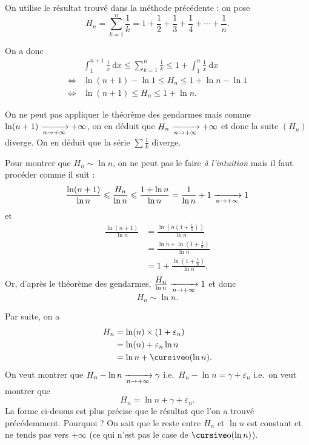 \begin{exo}
	On utilise le résultat trouvé dans la méthode précédente : on pose \[
		H_n = \sum_{k=1}^{n} \frac{1}{k} = 1 + \frac{1}{2} + \frac{1}{3} + \frac{1}{4} + \cdots + \frac{1}{n}
	.\]

	On a donc
	\begin{align*}
		&\int_{1}^{n+1} \frac{1}{x}~\mathrm{d}x \le \sum_{k=1}^{n} \frac{1}{k} \le 1 + \int_{1}^{n} \frac{1}{x}~\mathrm{d}x\\
		\iff& \ln(n+1) - \ln1 \le H_n \le 1 + \ln n - \ln 1\\
		\iff& \boxed{\ln(n+1) \le H_n \le 1 + \ln n.}
	\end{align*}

	On ne peut pas appliquer le théorème des gendarmes mais comme $\ln(n+1) \xrightarrow[n\to +\infty]{} +\infty$, on en déduit que $H_n \xrightarrow[n\to +\infty]{} +\infty$\/ et donc la suite $(H_n)$\/ diverge.
	On en déduit que la série $\sum \frac{1}{k}$\/ diverge.

	Pour montrer que $H_n \sim \ln n$, on ne peut pas le faire {\it à l'intuition}\/ mais il faut procéder comme il suit : \[
		\frac{\ln(n+1)}{\ln n} \leqslant \frac{H_n}{\ln n} \leqslant \frac{1 + \ln n}{\ln n} = \frac{1}{\ln n} + 1 \xrightarrow[n\to +\infty]{} 1
	\] et
	\begin{align*}
		\frac{\ln (n+1)}{\ln n} &= \frac{\ln\left( n \left( 1+\frac{1}{n} \right) \right) }{\ln n} \\
		&= \frac{\ln n + \ln \left( 1+ \frac{1}{n} \right)}{ \ln n} \\
		&= 1+ \frac{\ln\left( 1+\frac{1}{n} \right)}{\ln n}. \\
	\end{align*}
	Or, d'après le théorème des gendarmes, $\frac{\displaystyle H_n}{\ln n} \xrightarrow[n\to +\infty]{} 1$\/ et donc \[
		\boxed{H_n \sim \ln n.}
	\]

	Par suite, on a
	\begin{align*}
		H_n &= \ln(n) \times (1+\varepsilon_n) \\
		&= \ln(n) + \varepsilon_n \ln n \\
		&= \ln n + \po(\ln n). \\
	\end{align*}
	On veut montrer que $H_n - \ln n \xrightarrow[n\to +\infty]{} \gamma$ i.e.\ $H_n - \ln n = \gamma + \varepsilon_n$\/ i.e.\ on veut montrer que \[
		H_n = \ln n + \gamma + \varepsilon_n
	.\]
	La forme ci-dessus est plus précise que le résultat que l'on a trouvé précédemment. Pourquoi ? On sait que le reste entre $H_n$\/ et $\ln n$\/ est constant et ne tends pas vers $+\infty$ (ce qui n'est pas le case de $\po(\ln n)$).


\end{exo}
